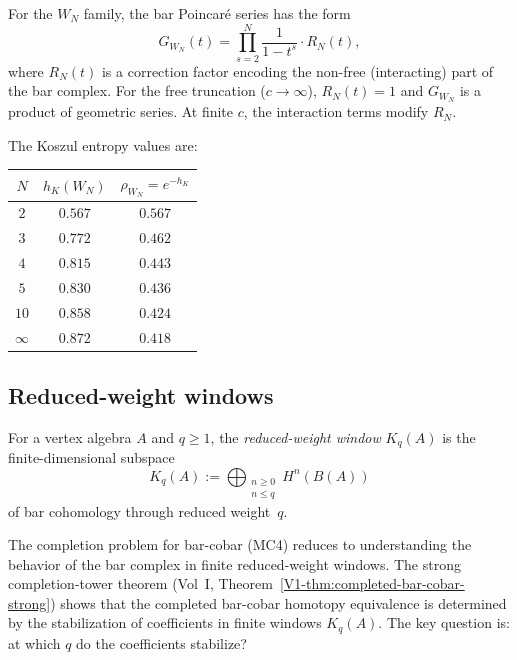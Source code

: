 \begin{computation}
For the $W_N$ family, the bar Poincar\'e series has the form
\[
G_{W_N}(t) = \prod_{s=2}^{N} \frac{1}{1 - t^s}
\cdot R_N(t),
\]
where $R_N(t)$ is a correction factor encoding the non-free
(interacting) part of the bar complex. For the free truncation
($c \to \infty$), $R_N(t) = 1$ and $G_{W_N}$ is a product of
geometric series. At finite $c$, the interaction terms modify $R_N$.

The Koszul entropy values are:

\smallskip
\begin{center}
\begin{tabular}{c c c}
$N$ & $h_K(W_N)$ & $\rho_{W_N} = e^{-h_K}$ \\
\hline
$2$ & $0.567$ & $0.567$ \\
$3$ & $0.772$ & $0.462$ \\
$4$ & $0.815$ & $0.443$ \\
$5$ & $0.830$ & $0.436$ \\
$10$ & $0.858$ & $0.424$ \\
$\infty$ & $0.872$ & $0.418$
\end{tabular}
\end{center}
\end{computation}

\subsection{Reduced-weight windows}

\begin{definition}
For a vertex algebra $A$ and $q \ge 1$, the \emph{reduced-weight window}
$K_q(A)$ is the finite-dimensional subspace
\begin{equation}%
K_q(A)
:=
\bigoplus_{\substack{n \ge 0 \\ n \le q}}
H^n(B(A))
\end{equation}
of bar cohomology through reduced weight~$q$.
\end{definition}

\begin{remark}
The completion problem for bar-cobar (MC4) reduces to understanding
the behavior of the bar complex in finite reduced-weight windows.
The strong completion-tower theorem
(Vol~I, Theorem~\ref*{V1-thm:completed-bar-cobar-strong})
shows that the completed bar-cobar homotopy equivalence is
determined by the stabilization of coefficients in finite windows
$K_q(A)$. The key question is: at which $q$ do the coefficients
stabilize?
\end{remark}

